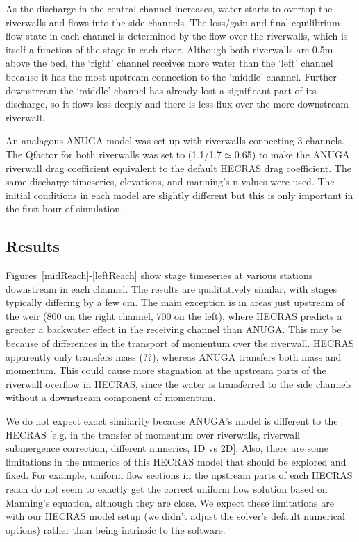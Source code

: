 As the discharge in the central channel increases, water starts to overtop the
riverwalls and flows into the side channels. The loss/gain and final
equilibrium flow state in each channel is determined by the flow over the
riverwalls, which is itself a function of the stage in each river. Although
both riverwalls are 0.5m above the bed, the `right' channel receives more water
than the `left' channel because it has the most upstream connection to the
`middle' channel. Further downstream the `middle' channel has already lost a
significant part of its discharge, so it flows less deeply and there is less flux over
the more downstream riverwall.

An analagous ANUGA model was set up with riverwalls connecting 3 channels.
The Qfactor for both riverwalls was set to (1.1/1.7$\simeq$0.65) to make the ANUGA
riverwall drag coefficient equivalent to the default HECRAS drag coefficient. The
same discharge timeseries, elevations, and manning's n values were used. The
initial conditions in each model are slightly different but this is only
important in the first hour of simulation.

\subsection{Results}

Figures~\ref{midReach}-\ref{leftReach} show stage timeseries at various
stations downstream in each channel. The results are qualitatively similar,
with stages typically differing by a few cm. The main exception is in areas
just upstream of the weir (800 on the right channel, 700 on the left), where
HECRAS predicts a greater a backwater effect in the receiving channel than
ANUGA. This may be because of differences in the transport of momentum over the
riverwall. HECRAS apparently only transfers mass (??), whereas ANUGA transfers
both mass and momentum. This could cause more stagnation at the upstream parts
of the riverwall overflow in HECRAS, since the water is transferred to the side
channels without a downstream component of momentum.

We do not expect exact similarity because ANUGA's model is different to the
HECRAS [e.g. in the transfer of momentum over riverwalls, riverwall submergence
correction, different numerics, 1D vs 2D]. Also, there are some limitations in
the numerics of this HECRAS model that should be explored and fixed. For
example, uniform flow sections in the upstream parts of each HECRAS reach do
not seem to exactly get the correct uniform flow solution based on Manning's
equation, although they are close. We expect these limitations are with our
HECRAS model setup (we didn't adjust the solver's default numerical options)
rather than being intrinsic to the software. 

